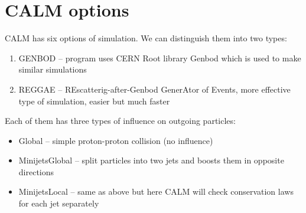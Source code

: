 \newpage
\section{CALM options}
\label{sec:CALMoptions}
CALM has six options of simulation. We can distinguish them into two types:
\begin{enumerate}
    \item GENBOD -- program uses CERN Root library Genbod which is used to make similar simulations
    \item REGGAE\cite{Meres:2011ek} -- REscatterig-after-Genbod GenerAtor of Events, more effective type of simulation, easier but much faster
\end{enumerate}
Each of them has three types of influence on outgoing particles:
\begin{itemize}
    \item Global -- simple proton-proton collision (no influence)
    \item MinijetsGlobal -- split particles into two jets and boosts them in opposite directions
    \item MinijetsLocal -- same as above but here CALM will check conservation laws for each jet separately 
\end{itemize}

